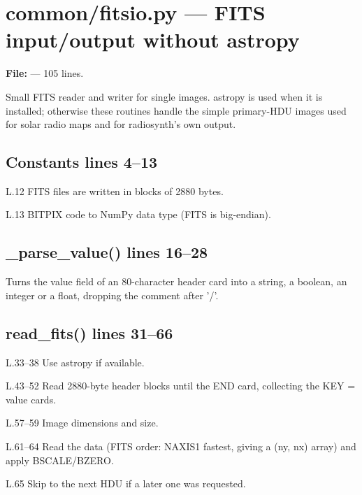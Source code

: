 \chapter{common/fitsio.py --- FITS input/output without astropy}
\label{mod:common:fitsio.py}
\textbf{File:}  --- 105 lines.

Small FITS reader and writer for single images. astropy is used when it is
installed; otherwise these routines handle the simple primary-HDU images used for
solar radio maps and for radiosynth's own output.

\section*{\normalsize Constants \hfill{\small\mdseries\color{gray}lines 4--13}}

\begin{lines}
\item[L.12] FITS files are written in blocks of 2880 bytes.
\item[L.13] BITPIX code to NumPy data type (FITS is big-endian).
\end{lines}
\section*{\normalsize \_parse\_value() \hfill{\small\mdseries\color{gray}lines 16--28}}

Turns the value field of an 80-character header card into a string, a boolean, an integer or a float, dropping the comment after '/'.

\section*{\normalsize read\_fits() \hfill{\small\mdseries\color{gray}lines 31--66}}

\begin{lines}
\item[L.33–38] Use astropy if available.
\item[L.43–52] Read 2880-byte header blocks until the END card, collecting the KEY = value cards.
\item[L.57–59] Image dimensions and size.
\item[L.61–64] Read the data (FITS order: NAXIS1 fastest, giving a (ny, nx) array) and apply BSCALE/BZERO.
\item[L.65] Skip to the next HDU if a later one was requested.
\end{lines}
